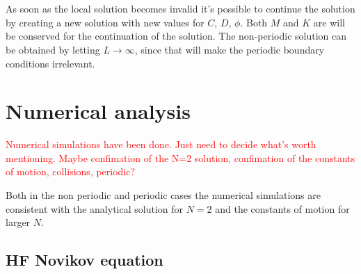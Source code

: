 \documentclass[english,master]{liumaiex}
\theoremstyle{plain}
\theoremstyle{definition}
\newcommand\todo[1]{\textcolor{red}{#1}}
\begin{document}
\\ \\
As soon as the local solution becomes invalid it's possible to continue the solution by creating a new solution with new values for $C$, $D$, $\phi$. Both $M$ and $K$ are will be conserved for the continuation of the solution. The non-periodic solution can be obtained by letting $L \rightarrow \infty$, since that will make the periodic boundary conditions irrelevant.

\section{Numerical analysis} \label{sec:Numerical}

\todo{Numerical simulations have been done. Just need to decide what's worth mentioning. Maybe confimation of the N=2 solution, confimation of the constants of motion, collisions, periodic?}

Both in the non periodic and periodic cases the numerical simulations are consistent with the analytical solution for $N = 2$ and the constants of motion for larger $N$.

\subsection{HF Novikov equation}
\end{document}
